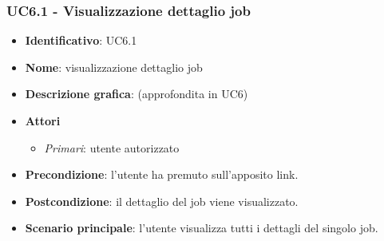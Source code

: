 \subsubsection{UC6.1 - Visualizzazione dettaglio job}
\begin{itemize}
  \item \textbf{Identificativo}: UC6.1
  \item \textbf{Nome}: visualizzazione dettaglio job
  \item \textbf{Descrizione grafica}: (approfondita in UC6)
  \item \textbf{Attori}
        \begin{itemize}
          \item \textit{Primari}: utente autorizzato
        \end{itemize}
  \item \textbf{Precondizione}: l'utente ha premuto sull'apposito link.
  \item \textbf{Postcondizione}: il dettaglio del job viene visualizzato.
  \item \textbf{Scenario principale}: l'utente visualizza tutti i dettagli del singolo job.
\end{itemize}
